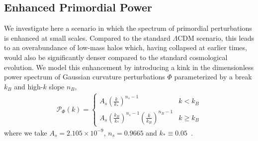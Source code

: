 \documentclass[prd,aps,10pt,nofootinbib,twocolumn,superscriptaddress,preprintnumbers,balancelastpage,longbibliography]{revtex4-1}
\newcommand{\vect}[1]{\boldsymbol{\mathbf{#1}}}
\newcommand{\dd}{\mathrm{d}}
\newcommand{\GN}{G_\mathrm{N}}
\newcommand{\blue}[1]{\textcolor{deepblue}{\bf #1}}
\begin{document}


\subsection{Enhanced Primordial Power}

We investigate here a scenario in which the spectrum of primordial perturbations is enhanced at small scales. Compared to the standard $\Lambda$CDM scenario, this leads to an overabundance of low-mass halos which, having collapsed at earlier times, would also be significantly denser compared to the standard cosmological evolution. We model this enhancement by introducing a kink in the dimensionless power spectrum of Gaussian curvature perturbations $\Phi$ parameterized by a break $k_B$ and high-$k$ slope $n_B$,
\begin{align}
\mathcal{P}_{\Phi}(k) = \begin{cases} 
A_s \left( \frac{k}{k_*} \right)^{n_s -1} & k < k_B \\ 
A_s \left( \frac{k_B}{k_*} \right)^{n_s -1}\left( \frac{k}{k_B} \right)^{n_B -1} & k \ge k_B 
\end{cases}
\end{align}
where we take $A_s = 2.105\times10^{-9}$, $n_s=0.9665$ and $k_*\equiv0.05$~\cite{Aghanim:2018eyx}.%
\end{document}
